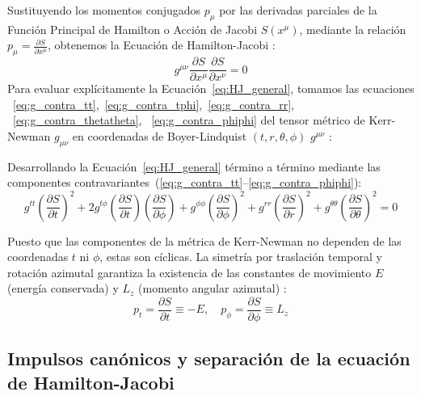 Sustituyendo los momentos conjugados $p_\mu$ por las derivadas parciales de la Función Principal de Hamilton o Acción de Jacobi $S(x^\mu)$, mediante la relación $p_\mu = \frac{\partial S}{\partial x^\mu}$, obtenemos la Ecuación de Hamilton-Jacobi \citep{05villegas}:
\begin{equation}
    g^{\mu\nu} \frac{\partial S}{\partial x^\mu} \frac{\partial S}{\partial x^\nu} = 0
    \label{eq:HJ_general}
\end{equation}
\newpage
Para evaluar explícitamente la Ecuación~\eqref{eq:HJ_general}, tomamos las ecuaciones ~\eqref{eq:g_contra_tt},~\eqref{eq:g_contra_tphi},~\eqref{eq:g_contra_rr}, ~\eqref{eq:g_contra_thetatheta}, ~\eqref{eq:g_contra_phiphi} del tensor métrico de Kerr-Newman $g_{\mu\nu}$ en coordenadas de Boyer-Lindquist $(t, r, \theta, \phi)$ $g^{\mu\nu}$ \citep{1403.5234v2, chaos_fractals_photon_ring}:


Desarrollando la Ecuación~\eqref{eq:HJ_general} término a término mediante las componentes contravariantes~(\ref{eq:g_contra_tt}--\ref{eq:g_contra_phiphi}):
\begin{equation}
    g^{tt}\left(\frac{\partial S}{\partial t}\right)^2 + 2g^{t\phi}\left(\frac{\partial S}{\partial t}\right)\left(\frac{\partial S}{\partial \phi}\right) + g^{\phi\phi}\left(\frac{\partial S}{\partial \phi}\right)^2 + g^{rr}\left(\frac{\partial S}{\partial r}\right)^2 + g^{\theta\theta}\left(\frac{\partial S}{\partial \theta}\right)^2 = 0
    \label{eq:HJ_expandida}
\end{equation}

Puesto que las componentes de la métrica de Kerr-Newman no dependen de las coordenadas $t$ ni $\phi$, estas son cíclicas. La simetría por traslación temporal y rotación azimutal garantiza la existencia de las constantes de movimiento $E$ (energía conservada) y $L_z$ (momento angular azimutal) \citep{ chaos_fractals_photon_ring}:
\begin{equation}
    p_t = \frac{\partial S}{\partial t} \equiv -E, \quad p_\phi = \frac{\partial S}{\partial \phi} \equiv L_z
    \label{eq:constantes_E_Lz}
\end{equation}


\subsection{Impulsos canónicos y separación de la ecuación de Hamilton-Jacobi}

